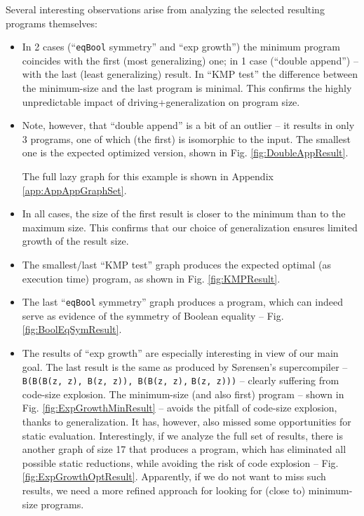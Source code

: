 \documentclass[submission,copyright,creativecommons]{eptcs}
\newif\ifVptVer
\begin{document}
Several interesting observations arise from analyzing the selected resulting programs themselves:
\begin{itemize}
  \item In 2 cases (``\verb|eqBool| symmetry'' and ``exp growth'') the minimum program coincides with the first (most generalizing) one;
    in 1 case (``double append'') -- with the last (least generalizing) result. 
    In ``KMP test'' the difference between the minimum-size and the last program is minimal.
    This confirms the highly unpredictable impact of driving+generalization on program size.
  \item Note, however, that ``double append'' is a bit of an outlier -- it results in only 3 programs,
    one of which (the first) is isomorphic to the input. The smallest one is the expected
    optimized version, shown in Fig. \ref{fig:DoubleAppResult}.
\ifVptVer
\else    
    The full lazy graph for this example is shown in Appendix \ref{app:AppAppGraphSet}.
\fi    
  \item In all cases, the size of the first result is closer to the minimum than to the maximum size.
    This confirms that our choice of generalization ensures limited growth of the result size.
  \item The smallest/last ``KMP test'' graph produces the expected optimal (as execution time) program,
    as shown in Fig. \ref{fig:KMPResult}.
  \item The last ``\verb|eqBool| symmetry'' graph produces a program, which can indeed serve as evidence of the
    symmetry of Boolean equality -- Fig. \ref{fig:BoolEqSymResult}.
  \item The results of ``exp growth'' are especially interesting in view of our main goal.
    The last result is the same as produced by S{\o}rensen's supercompiler --
    \verb|B(B(B(z, z), B(z, z)), B(B(z, z),| \verb|B(z, z)))| -- clearly suffering from code-size explosion.
    The minimum-size (and also first) program -- shown in Fig. \ref{fig:ExpGrowthMinResult} --
    avoids the pitfall of code-size explosion, thanks to generalization.
    It has, however, also missed some opportunities for static evaluation.
    Interestingly, if we analyze the full set of results, there is another
    graph of size 17 that produces a program, which has eliminated all possible static reductions,
    while avoiding the risk of code explosion -- Fig. \ref{fig:ExpGrowthOptResult}.
    Apparently, if we do not want to miss such results, we need a more refined approach for 
    looking for (close to) minimum-size programs.

\end{itemize}
\end{document}
